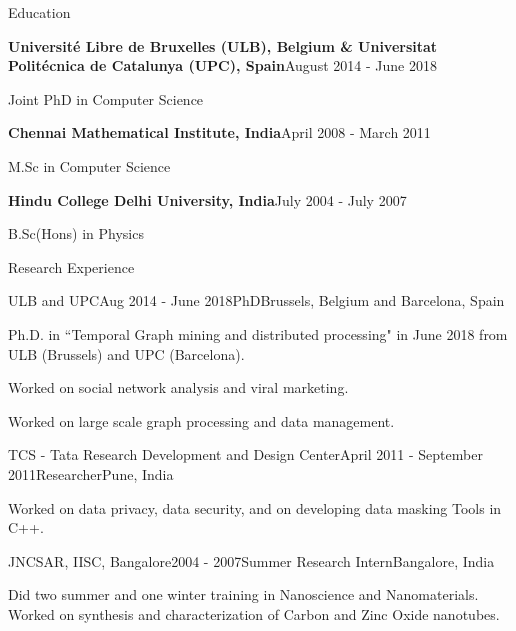 \documentclass{resume} %
\begin{document}
\begin{rSection}{Education}
\begin{rSubsection}{\bf Universit\'{e} Libre de Bruxelles (ULB), Belgium \&  Universitat Polit\'{e}cnica de Catalunya (UPC), Spain}{August 2014 - June 2018}{}{}  
\item Joint PhD in Computer Science 
\end{rSubsection}
\begin{rSubsection}{\bf Chennai Mathematical Institute, India}{April 2008 - March 2011}{}{}  
\item M.Sc in Computer Science 
\end{rSubsection}

\begin{rSubsection}{\bf Hindu College Delhi University, India}{July 2004 - July 2007}{}{}  
\item B.Sc(Hons) in Physics
\end{rSubsection}
\end{rSection}
\begin{rSection}{Research Experience}
\begin{rSubsection}{ULB and UPC}{Aug 2014 - June 2018}{PhD}{Brussels, Belgium and Barcelona, Spain}
 \item Ph.D. in ``Temporal Graph mining and distributed processing" in June 2018 from ULB (Brussels) and UPC (Barcelona). 
 \item Worked on social network analysis and viral marketing.
 \item Worked on large scale graph processing and data management.
\end{rSubsection}
\begin{rSubsection}{TCS - Tata Research Development and Design Center}{April 2011 - September 2011}{Researcher}{Pune, India}
\item Worked on data privacy, data security, and on developing data masking Tools in C++.
\end{rSubsection}
\begin{rSubsection}{JNCSAR, IISC, Bangalore}{2004 - 2007}{Summer Research Intern}{Bangalore, India}
\item Did two summer and one winter training in Nanoscience and Nanomaterials. Worked on synthesis and characterization of Carbon and Zinc Oxide nanotubes.
\end{rSubsection}
\end{rSection}
\end{document}
